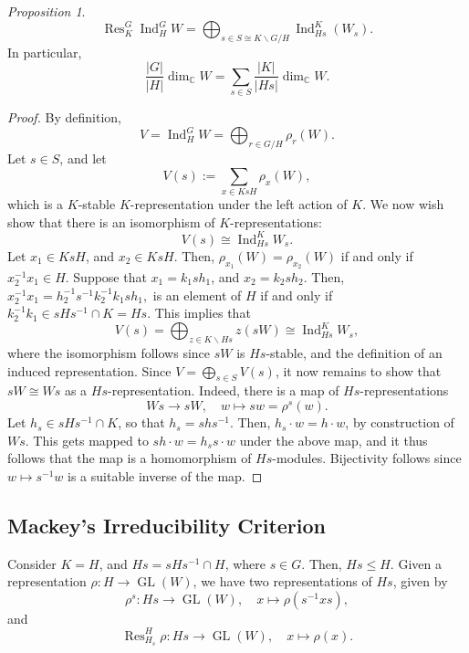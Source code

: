 \documentclass[a4paper]{report}
\theoremstyle{definition}
\theoremstyle{remark}
\theoremstyle{proposition}
\newtheorem{proposition}{Proposition}
\theoremstyle{conjecture}
\theoremstyle{lemma}
\theoremstyle{corollary}
\theoremstyle{exercise}
\theoremstyle{example}
\newcommand{\C}{\mathbb{C}}
\newcommand{\on}{\operatorname}
\begin{document}
\begin{proposition}\label{prop_res_of_ind}
    $$\on{Res}_K^G\on{Ind}_H^GW = \bigoplus_{s\in S \cong K\backslash G/H} \on{Ind}_{Hs}^K(W_s).$$
    In particular,
    $$\frac{\vert G\vert}{\vert H\vert} \dim_\C W= \sum_{s \in S} \frac{\vert K\vert}{\vert Hs\vert} \dim_\C W.$$
\end{proposition}

\begin{proof}
    By definition,
    $$V = \on{Ind}_H^GW = \bigoplus_{r \in G/H} \rho_r(W).$$
    Let $s \in S$, and let $$V(s) := \sum_{x \in KsH} \rho_x(W),$$
    which is a $K$-stable $K$-representation under the left action of $K$.
    We now wish show that there is an isomorphism of $K$-representations:
    $$V(s) \cong \on{Ind}_{Hs}^K W_s.$$
    Let $x_1 \in KsH$, and $x_2 \in KsH$. Then, $\rho_{x_1}(W) = \rho_{x_2}(W)$
    if and only if $x_2^{-1}x_1\in H$.
    Suppose that $x_1 = k_1sh_1$, and $x_2 = k_2sh_2$. 
    Then, $x_2^{-1}x_1 = h_2^{-1} s^{-1}k_2^{-1}k_1sh_1,$ is an element of $H$
    if and only if $k_2^{-1}k_1 \in sHs^{-1}\cap K = Hs$.
    This implies that 
    $$V(s) = \bigoplus_{z \in K\backslash Hs} z(sW) \cong \on{Ind}_{Hs}^KW_s,$$
    where the isomorphism follows since $sW$ is $Hs$-stable, and the 
    definition of an induced representation.
    Since $V = \bigoplus_{s \in S} V(s)$, it now remains to show that 
    $sW \cong Ws$ as a $Hs$-representation. 
    Indeed, there is a map of $Hs$-representations
    $$Ws \longrightarrow sW,\quad w \longmapsto sw = \rho^s(w).$$
    Let $h_s \in sHs^{-1}\cap K$, so that 
    $h_s = shs^{-1}$. Then, $h_s\cdot w = h\cdot w$, by construction of 
    $Ws$. This gets mapped to $sh\cdot w = h_s s \cdot w$ under the above
    map, and it thus follows that the map is a homomorphism of $Hs$-modules.
    Bijectivity follows since $w\mapsto s^{-1}w$ is a suitable inverse of the 
    map. 

\end{proof}

\subsection{Mackey's Irreducibility Criterion}
Consider $K = H$, and $Hs = sHs^{-1}\cap H$, where $s\in G$.
Then, $Hs \leq H$. Given a representation $\rho : H \to \on{GL}(W)$, 
we have two representations of $Hs$, given by 
$$\rho^s: Hs \longrightarrow \on{GL}(W),\quad x\longmapsto \rho(s^{-1}xs),$$
and 
$$\on{Res}_{H_s}^H\rho : Hs \longrightarrow \on{GL}(W),\quad x\longmapsto \rho(x).$$
\end{document}

